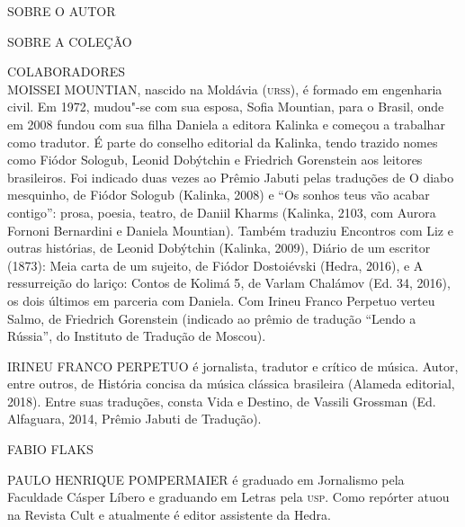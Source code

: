 \pagebreak
\thispagestyle{empty}

\movetooddpage
\small\textlt
\label{colaboradores}

\noindent{}SOBRE O AUTOR\\


\lipsum[1]
\lipsum[2]
\lipsum[3]
\lipsum[5]
\lipsum[6]
\lipsum[7]

\bigskip

\noindent{}SOBRE A COLEÇÃO\\

\lipsum[1]

\pagebreak

\noindent{}COLABORADORES\\

\noindent{}MOISSEI MOUNTIAN, nascido na Moldávia (\textsc{urss}), é formado em engenharia civil. Em 1972, mudou"-se com sua esposa, Sofia Mountian, para o Brasil,
onde em 2008 fundou com sua filha Daniela a editora Kalinka e começou a
trabalhar como tradutor. É parte do conselho editorial da Kalinka, tendo
trazido nomes como Fiódor Sologub, Leonid Dobýtchin e Friedrich
Gorenstein aos leitores brasileiros. Foi indicado duas vezes ao Prêmio
Jabuti pelas traduções de {\textltit O diabo mesquinho}, de Fiódor Sologub
(Kalinka, 2008) e {\textltit “Os sonhos teus vão acabar contigo”: prosa,
poesia, teatro}, de Daniil Kharms (Kalinka, 2103, com Aurora Fornoni
Bernardini e Daniela Mountian). Também traduziu {\textltit Encontros com Liz
e outras histórias}, de Leonid Dobýtchin (Kalinka, 2009), {\textltit Diário
de um escritor (1873): Meia carta de um sujeito}, de Fiódor Dostoiévski
(Hedra, 2016), e {\textltit A ressurreição do lariço: Contos de Kolimá 5}, de
Varlam Chalámov (Ed. 34, 2016), os dois últimos em parceria com Daniela.
Com Irineu Franco Perpetuo verteu {\textltit Salmo}, de Friedrich Gorenstein
(indicado ao prêmio de tradução “Lendo a Rússia”, do Instituto de
Tradução de Moscou).

\medskip

\noindent{}IRINEU FRANCO PERPETUO é jornalista, tradutor e crítico de música. Autor, entre outros, de {\textltit História concisa da música clássica brasileira} (Alameda editorial, 2018). Entre suas traduções, consta {\textltit Vida e Destino}, de Vassili Grossman (Ed. Alfaguara, 2014, Prêmio Jabuti de Tradução).

\medskip

\noindent{}FABIO FLAKS \lipsum[12]

\medskip

\noindent{}PAULO HENRIQUE POMPERMAIER é graduado em Jornalismo pela Faculdade Cásper Líbero e graduando em Letras pela \textsc{usp}. Como repórter atuou na Revista {\textltit Cult} e atualmente é editor assistente da Hedra.

